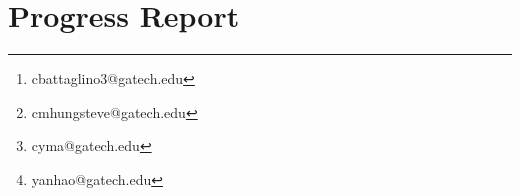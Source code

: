 \documentclass{article}
\title{\ourtitle}
\author{Casey Battaglino\thanks{cbattaglino3@gatech.edu}}
\author{Min-Hung Chen\thanks{cmhungsteve@gatech.edu}}
\author{Chih-Yao Ma\thanks{cyma@gatech.edu}}
\author{Hao Yan\thanks{yanhao@gatech.edu}}
\affil{Georgia Institute of Technology}
\begin{document}
\maketitle
\section{Progress Report}                  \label{sec:progress}
                                           
 
%
\end{document}
